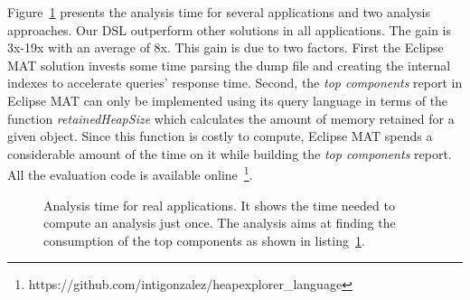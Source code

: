 Figure~\ref{fig:analysisTime} presents the analysis time for several applications and two analysis approaches. Our DSL outperform other solutions in all applications.
The gain is 3x-19x with an average of 8x.
This gain is due to two factors.
First the Eclipse MAT solution invests some time parsing the dump file and creating the internal indexes to accelerate queries' response time.
Second, the \textit{top components} report in Eclipse MAT can only be implemented using its query language in terms of the function \textit{retainedHeapSize} which calculates the amount of memory retained for a given object.
Since this function is costly to compute, Eclipse MAT spends a considerable amount of the time on it while building the \textit{top components} report. All the evaluation code is available online~\footnote{https://github.com/intigonzalez/heapexplorer\_language}.

\begin{figure}[!b]
\centering
{}
\caption{Analysis time for real applications. It shows the time needed to compute an analysis just once. The analysis aims at finding the consumption of the top components as shown in listing~\ref{fig:analysisTime}.\label{fig:analysisTime}}
\end{figure}

